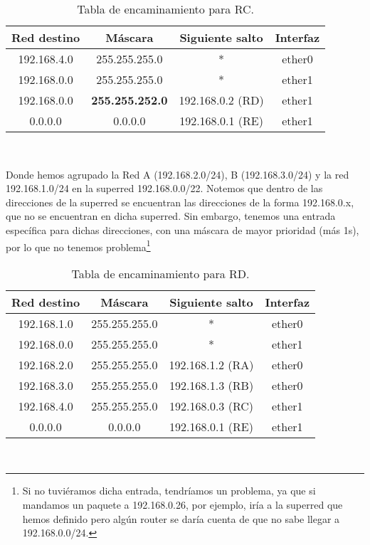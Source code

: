 \begin{ejercicio}
    \begin{table}[H]
        \centering
        \begin{tabular}{|c|c|c|c|}
            \hline
            Red destino & Máscara & Siguiente salto & Interfaz \\
            \hline
            192.168.4.0 & 255.255.255.0 & * & ether0 \\
            \hline
            192.168.0.0 & 255.255.255.0 & * & ether1 \\
            \hline
            192.168.0.0 & \textbf{255.255.252.0} & 192.168.0.2 (RD) & ether1 \\
            \hline
            0.0.0.0 & 0.0.0.0 & 192.168.0.1 (RE) & ether1 \\
            \hline
        \end{tabular}\\
        \caption{Tabla de encaminamiento para RC.}
    \end{table}
    Donde hemos agrupado la Red A (192.168.2.0/24), B (192.168.3.0/24) y la red 192.168.1.0/24 en la superred 192.168.0.0/22.
    Notemos que dentro de las direcciones de la superred se encuentran las direcciones de la forma 192.168.0.x, que no se encuentran en dicha superred. Sin embargo, tenemos una entrada específica para dichas direcciones, con una máscara de mayor prioridad (más 1s), por lo que no tenemos problema\footnote{Si no tuviéramos dicha entrada, tendríamos un problema, ya que si mandamos un paquete a 192.168.0.26, por ejemplo, iría a la superred que hemos definido pero algún router se daría cuenta de que no sabe llegar a 192.168.0.0/24.}

    \begin{table}[H]
        \centering
        \begin{tabular}{|c|c|c|c|}
            \hline
            Red destino & Máscara & Siguiente salto & Interfaz \\
            \hline
            192.168.1.0 & 255.255.255.0 & * & ether0 \\
            \hline
            192.168.0.0 & 255.255.255.0 & * & ether1 \\
            \hline
            192.168.2.0 & 255.255.255.0 & 192.168.1.2 (RA) & ether0 \\
            \hline
            192.168.3.0 & 255.255.255.0 & 192.168.1.3 (RB) & ether0 \\
            \hline
            192.168.4.0 & 255.255.255.0 & 192.168.0.3 (RC) & ether1 \\
            \hline
            0.0.0.0 & 0.0.0.0 & 192.168.0.1 (RE) & ether1 \\
            \hline
        \end{tabular}\\
        \caption{Tabla de encaminamiento para RD.}
    \end{table}


\end{ejercicio}
